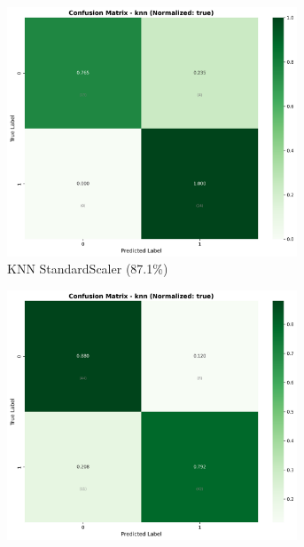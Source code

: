 \begin{figure}[H]
\centering
\begin{subfigure}[b]{0.31\textwidth}
\centering
\includegraphics[width=0.95\textwidth]{Result/cleveland_dataset/confusion_matrices/knn_numeric_dataset_StandardScaler.png}
\caption{KNN StandardScaler (87.1\%)}
\label{fig:knn_standard_performance}
\end{subfigure}
\hfill
\begin{subfigure}[b]{0.31\textwidth}
\centering
\includegraphics[width=0.95\textwidth]{Result/heart_dataset/confusion_matrices/knn_numeric_dataset_StandardScaler.png}

\end{subfigure}
\end{figure}

